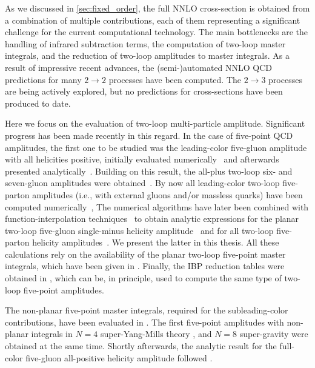 As we discussed in \cref{sec:fixed_order}, the full NNLO cross-section 
is obtained from a combination of multiple contributions, each of them
representing a significant challenge for the current computational technology.
The main bottlenecks are
the handling of infrared subtraction terms,
the computation of two-loop master integrals, 
and the reduction of two-loop amplitudes to master integrals.
As a result of impressive recent advances, the (semi-)automated NNLO QCD predictions for
many $2\to2$ processes have been computed.
The $2\to3$ processes are being actively explored, but no predictions for cross-sections have been produced to date.

Here we focus on the evaluation of two-loop multi-particle amplitude.
Significant progress has been made recently in this regard.
In the case of five-point QCD amplitudes, the first one to be studied
was the leading-color five-gluon amplitude with all helicities positive, initially
evaluated numerically~\cite{Badger:2013gxa} and  
afterwards presented analytically~\cite{Gehrmann:2015bfy,Dunbar:2016aux}.
Building on this result, the all-plus two-loop six- and seven-gluon amplitudes were
obtained~\cite{Dunbar:2016gjb,Dunbar:2017nfy}.
By now all leading-color
two-loop five-parton amplitudes (i.e., with external gluons and/or
massless quarks) have been computed
numerically~\cite{Badger:2017jhb, Abreu:2017hqn, Badger:2018gip, Abreu:2018jgq},
The numerical algorithms have later been combined with
function-interpolation techniques~\cite{Peraro:2019svx,Peraro:2016wsq,Klappert:2019emp} to obtain
analytic expressions for the planar two-loop five-gluon single-minus helicity
amplitude~\cite{Badger:2018enw} and for all two-loop five-parton helicity
amplitudes~\cite{Abreu:2018zmy,Abreu:2019odu}.
We present the latter in this thesis.
All these calculations rely on the availability of the planar two-loop five-point master
integrals, which have been given in \cite{Papadopoulos:2015jft,Gehrmann:2018yef}. 
Finally, the IBP reduction tables were obtained in \cite{Boels:2018nrr,Chawdhry:2018awn}, which can be, in principle, used to compute the
same type of two-loop five-point amplitudes.

The non-planar five-point master integrals, required for the subleading-color contributions,
have been evaluated in \cite{Abreu:2018aqd,Chicherin:2018old}.
The first five-point amplitudes with non-planar integrals in $N=4$ super-Yang-Mills theory \cite{Chicherin:2018yne,Abreu:2018aqd},
and $N=8$ super-gravity \cite{Chicherin:2019xeg,Abreu:2019rpt}
were obtained at the same time.
Shortly afterwards, the analytic result for the full-color five-gluon all-positive helicity amplitude
followed \cite{Badger:2019djh}.

